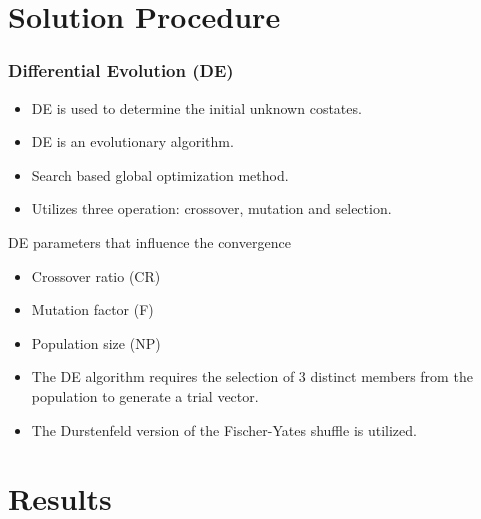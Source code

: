 \documentclass{beamer}
\begin{document}
\section{Solution Procedure}
\begin{frame}
	\frametitle{Differential Evolution (DE)}
	\begin{itemize}
		\vspace{-3mm}
		\item DE is used to determine the initial unknown costates.
		\item DE is an evolutionary algorithm.
		\item Search based global optimization method.
		\item Utilizes three operation: crossover, mutation and selection.
	\end{itemize}
	\vspace{-3mm}
	\begin{block}{DE parameters that influence the convergence}
		\vspace{-2.5mm}
		\begin{itemize}
			\item Crossover ratio (CR)
			\item Mutation factor (F)
			\item Population size (NP)
			\vspace{-2.5mm}
		\end{itemize}
	\end{block}
	\begin{itemize}
		\vspace{-2mm}
		\item The DE algorithm requires the selection of 3 distinct members from the population to generate a trial vector. 
		\item The Durstenfeld version of the Fischer-Yates shuffle is utilized.
	\end{itemize}
\end{frame}

\section{Results}
\end{document}
